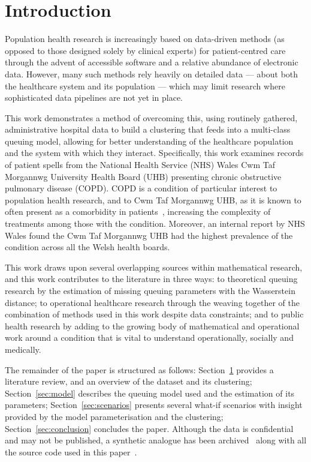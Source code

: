\myrule%

\section{Introduction}\label{sec:intro}

Population health research is increasingly based on data-driven methods (as
opposed to those designed solely by clinical experts) for patient-centred care
through the advent of accessible software and a relative abundance of electronic
data. However, many such methods rely heavily on detailed data — about both the
healthcare system and its population — which may limit research where
sophisticated data pipelines are not yet in place.

This work demonstrates a method of overcoming this, using routinely gathered,
administrative hospital data to build a clustering that feeds into a multi-class
queuing model, allowing for better understanding of the healthcare population
and the system with which they interact. Specifically, this work examines
records of patient spells from the National Health Service (NHS) Wales Cwm Taf
Morgannwg University Health Board (UHB) presenting chronic obstructive pulmonary
disease (COPD). COPD is a condition of particular interest to population health
research, and to Cwm Taf Morgannwg UHB, as it is known to often present as a
comorbidity in patients~\cite{Houben2019}, increasing the complexity of
treatments among those with the condition. Moreover, an internal report by NHS
Wales found the Cwm Taf Morgannwg UHB had the highest prevalence of the
condition across all the Welsh health boards.

This work draws upon several overlapping sources within mathematical research,
and this work contributes to the literature in three ways: to theoretical
queuing research by the estimation of missing queuing parameters with the
Wasserstein distance; to operational healthcare research through the weaving
together of the combination of methods used in this work despite data
constraints; and to public health research by adding to the growing body of
mathematical and operational work around a condition that is vital to understand
operationally, socially and medically.

The remainder of the paper is structured as follows: Section~\ref{sec:intro}
provides a literature review, and an overview of the dataset and its clustering;
Section~\ref{sec:model} describes the queuing model used and the estimation of
its parameters; Section~\ref{sec:scenarios} presents several what-if scenarios
with insight provided by the model parameterisation and the clustering;
Section~\ref{sec:conclusion} concludes the paper. Although the data is
confidential and may not be published, a synthetic analogue has been
archived~\cite{Wilde2020synthetic} along with all the source code used in this
paper~\cite{Wilde2020github}.


